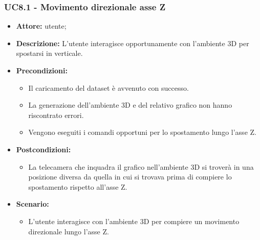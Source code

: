 \subsubsection{UC8.1 - Movimento direzionale asse Z}
\begin{itemize}    
    \item \textbf{Attore:} utente;
    \item \textbf{Descrizione:} L'utente interagisce opportunamente con l'ambiente 3D per spostarsi in verticale.
    \item \textbf{Precondizioni:}    
        \begin{itemize}
            \item Il caricamento del dataset è avvenuto con successo.
            \item La generazione dell'ambiente 3D e del relativo grafico non hanno riscontrato errori.
            \item Vengono eseguiti i comandi opportuni per lo spostamento lungo l'asse Z.
        \end{itemize}    
    \item \textbf{Postcondizioni:}
        \begin{itemize}
            \item La telecamera che inquadra il grafico nell'ambiente 3D si troverà in una posizione diversa da quella in cui si trovava prima di compiere lo spostamento rispetto all'asse Z.
        \end{itemize}    
    \item \textbf{Scenario:} 
        \begin{itemize}
            \item L'utente interagisce con l'ambiente 3D per compiere un movimento direzionale lungo l'asse Z.
        \end{itemize}
\end{itemize}

